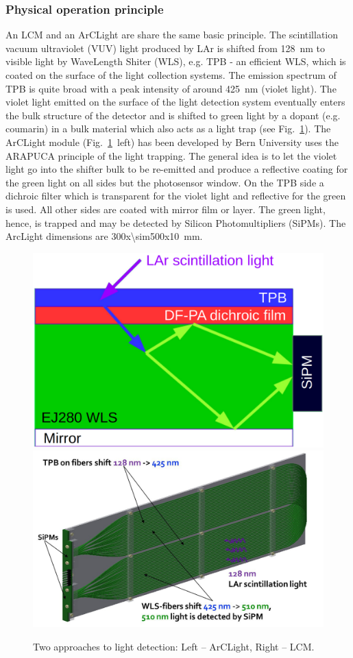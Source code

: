 \subsubsection{Physical operation principle}

An LCM and an ArCLight are share the same basic principle. The scintillation vacuum ultraviolet (VUV) light produced by LAr is shifted from \SI{128}{\nano\metre} to visible light by WaveLength Shiter (WLS), e.g. TPB - an efficient WLS, which is coated on the surface of the light collection systems. The emission spectrum of TPB is quite broad with a peak intensity of around \SI{425}{\nano\metre} (violet light). The violet light emitted on the surface of the light detection system eventually enters the bulk structure of the detector and is shifted to green light by a dopant (e.g. coumarin) in a bulk material which also acts as a light trap (see Fig.~\ref{fig:fig_modules}).
The ArCLight module (Fig.~\ref{fig:fig_modules}~left) has been developed by Bern University uses the ARAPUCA principle of the light trapping. The general idea is to let the violet light go into the shifter bulk to be re-emitted and produce a reflective coating for the green light on all sides but the photosensor window. On the TPB side a dichroic filter which is transparent for the violet light and reflective for the green is used. All other sides are coated with  mirror film or layer. The green light, hence, is trapped and may be detected by Silicon Photomultipliers (SiPMs). The ArcLight dimensions are \SI[product-units=repeat]{300x\sim500x10}{\milli\metre}.

\begin{figure}[htbp]
\centering 
\includegraphics[width=0.44\linewidth]{graphics/lartpc/Light/ArCLight.png}
\qquad
\includegraphics[width=0.5\linewidth]{graphics/lartpc/Light/lcm.jpeg}
\caption{\label{fig:fig_modules} Two approaches to light detection: Left – ArCLight, Right – LCM.}
\end{figure}



